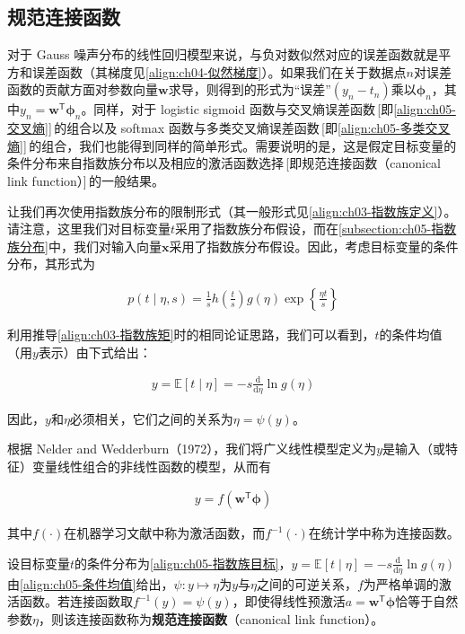 \documentclass[../../main.tex]{subfiles}
\begin{document}
\subsection{规范连接函数}\label{subsection:ch05-规范连接函数}

对于 Gauss 噪声分布的线性回归模型来说，与负对数似然对应的误差函数就是平方和误差函数（其梯度见\cref{align:ch04-似然梯度}）。如果我们在关于数据点$n$对误差函数的贡献方面对参数向量$\boldsymbol{w}$求导，则得到的形式为“误差”$(y_n-t_n)$乘以$\boldsymbol{\phi}_n$，其中$y_n=\boldsymbol{w}^{\mathsf{T}}\boldsymbol{\phi}_n$。同样，对于 logistic sigmoid 函数与交叉熵误差函数\,[即\eqref{align:ch05-交叉熵}]\,的组合以及 softmax 函数与多类交叉熵误差函数\,[即\eqref{align:ch05-多类交叉熵}]\,的组合，我们也能得到同样的简单形式。需要说明的是，这是假定目标变量的条件分布来自指数族分布以及相应的激活函数选择\,[即规范连接函数（canonical link function）]\,的一般结果。

让我们再次使用指数族分布的限制形式（其一般形式见\cref{align:ch03-指数族定义}）。请注意，这里我们对目标变量$t$采用了指数族分布假设，而在\cref{subsection:ch05-指数族分布}中，我们对输入向量$\boldsymbol{x}$采用了指数族分布假设。因此，考虑目标变量的条件分布，其形式为

\begin{align}
  p(t\mid\eta,s)=\frac{1}{s}h\left(\frac{t}{s}\right)g(\eta)\exp\left\{\frac{\eta t}{s}\right\}
  \label{align:ch05-指数族目标}
\end{align}

利用推导\cref{align:ch03-指数族矩}时的相同论证思路，我们可以看到，$t$的条件均值（用$y$表示）由下式给出：

\begin{align}
  y=\mathbb{E}[t\mid\eta]=-s\frac{\mathrm{d}}{\mathrm{d}\eta}\ln g(\eta)
  \label{align:ch05-条件均值}
\end{align}

因此，$y$和$\eta$必须相关，它们之间的关系为$\eta=\psi(y)$。

根据 Nelder and Wedderburn（1972），我们将广义线性模型定义为$y$是输入（或特征）变量线性组合的非线性函数的模型，从而有

\begin{align}
  y=f\left(\boldsymbol{w}^{\mathsf{T}}\boldsymbol{\phi}\right)
  \label{align:ch05-广义线性}
\end{align}

其中$f(\cdot)$在机器学习文献中称为激活函数，而$f^{-1}(\cdot)$在统计学中称为连接函数。

\begin{definition}[规范连接函数]\label{definition:ch05-规范连接函数}
设目标变量$t$的条件分布为\eqref{align:ch05-指数族目标}，$y=\mathbb{E}[t\mid\eta]=-s\frac{\mathrm{d}}{\mathrm{d}\eta}\ln g(\eta)$由\eqref{align:ch05-条件均值}给出，$\psi:y\mapsto\eta$为$y$与$\eta$之间的可逆关系，$f$为严格单调的激活函数。若连接函数取$f^{-1}(y)=\psi(y)$，即使得线性预激活$a=\boldsymbol{w}^{\mathsf{T}}\boldsymbol{\phi}$恰等于自然参数$\eta$，则该连接函数称为\textbf{规范连接函数}（canonical link function）。
\end{definition}
\end{document}

